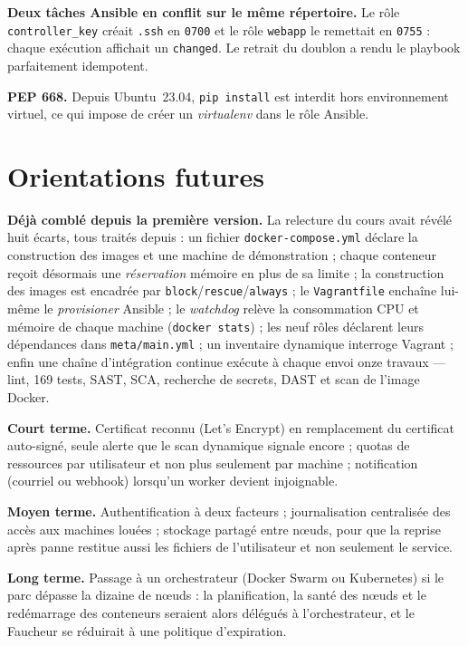 \documentclass[11pt,a4paper]{article}
\begin{document}
\textbf{Deux tâches Ansible en conflit sur le même répertoire.} Le rôle \texttt{controller\_key}
créait \texttt{.ssh} en \texttt{0700} et le rôle \texttt{webapp} le remettait en \texttt{0755} :
chaque exécution affichait un \texttt{changed}. Le retrait du doublon a rendu le playbook
parfaitement idempotent.

\textbf{PEP 668.} Depuis Ubuntu~23.04, \texttt{pip install} est interdit hors environnement virtuel,
ce qui impose de créer un \emph{virtualenv} dans le rôle Ansible.

\section{Orientations futures}

\textbf{Déjà comblé depuis la première version.} La relecture du cours avait révélé huit écarts, tous
traités depuis : un fichier \texttt{docker-compose.yml} déclare la construction des images et une
machine de démonstration ; chaque conteneur reçoit désormais une \emph{réservation} mémoire en plus
de sa limite ; la construction des images est encadrée par \texttt{block}/\texttt{rescue}/\texttt{always} ;
le \texttt{Vagrantfile} enchaîne lui-même le \emph{provisioner} Ansible ; le \emph{watchdog} relève
la consommation CPU et mémoire de chaque machine (\texttt{docker stats}) ; les neuf rôles déclarent
leurs dépendances dans \texttt{meta/main.yml} ; un inventaire dynamique interroge Vagrant ; enfin une
chaîne d'intégration continue exécute à chaque envoi onze travaux --- lint, 169 tests, SAST, SCA,
recherche de secrets, DAST et scan de l'image Docker.

\textbf{Court terme.} Certificat reconnu (Let's Encrypt) en remplacement du certificat auto-signé,
seule alerte que le scan dynamique signale encore ; quotas de ressources par utilisateur et non plus
seulement par machine ; notification (courriel ou webhook) lorsqu'un worker devient injoignable.

\textbf{Moyen terme.} Authentification à deux facteurs ; journalisation centralisée des accès aux
machines louées ; stockage partagé entre n\oe{}uds, pour que la reprise après panne restitue aussi
les fichiers de l'utilisateur et non seulement le service.

\textbf{Long terme.} Passage à un orchestrateur (Docker Swarm ou Kubernetes) si le parc dépasse la
dizaine de n\oe{}uds : la planification, la santé des n\oe{}uds et le redémarrage des conteneurs
seraient alors délégués à l'orchestrateur, et le Faucheur se réduirait à une politique d'expiration.
\end{document}
